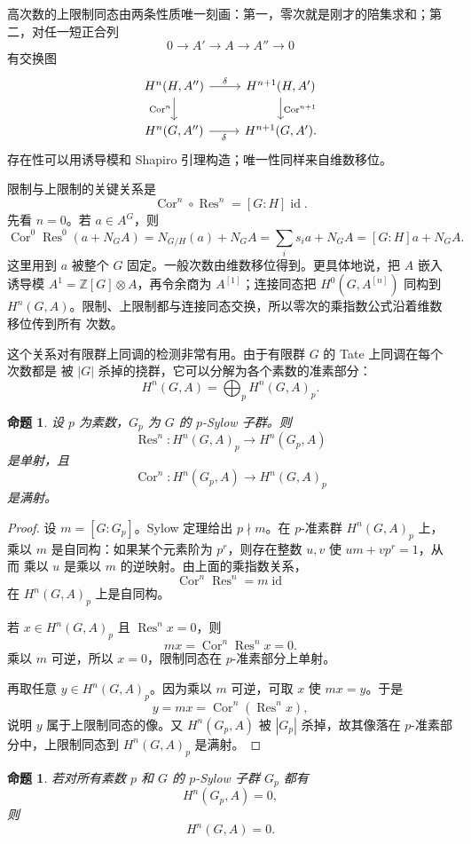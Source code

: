 \documentclass[11pt,a4paper,openany]{ctexbook}
\numberwithin{equation}{chapter}
\newcommand{\Z}{\mathbb{Z}}
\theoremstyle{plain}
\newtheorem{proposition}[theorem]{命题}
\theoremstyle{definition}
\theoremstyle{remark}
\begin{document}
高次数的上限制同态由两条性质唯一刻画：第一，零次就是刚才的陪集求和；第二，对任一短正合列
\[
0\to A'\to A\to A''\to0
\]
有交换图
\[
\begin{tikzcd}
H^n(H,A'')\arrow[r,"\delta"]\arrow[d,"\operatorname{Cor}^n"']&
H^{n+1}(H,A')\arrow[d,"\operatorname{Cor}^{n+1}"]\\
H^n(G,A'')\arrow[r,"\delta"']&
H^{n+1}(G,A').
\end{tikzcd}
\]
存在性可以用诱导模和 Shapiro 引理构造；唯一性同样来自维数移位。

限制与上限制的关键关系是
\[
\operatorname{Cor}^n\circ\operatorname{Res}^n=[G:H]\operatorname{id}.
\]
先看 $n=0$。若 $a\in A^G$，则
\[
\operatorname{Cor}^0\operatorname{Res}^0(a+N_GA)
=N_{G/H}(a)+N_GA
=\sum_i s_ia+N_GA
=[G:H]a+N_GA.
\]
这里用到 $a$ 被整个 $G$ 固定。一般次数由维数移位得到。更具体地说，把 $A$ 嵌入诱导模
$A^1=\Z[G]\otimes A$，再令余商为 $A^{[1]}$；连接同态把 $H^0(G,A^{[n]})$ 同构到
$H^n(G,A)$。限制、上限制都与连接同态交换，所以零次的乘指数公式沿着维数移位传到所有
次数。

这个关系对有限群上同调的检测非常有用。由于有限群 $G$ 的 Tate 上同调在每个次数都是
被 $|G|$ 杀掉的挠群，它可以分解为各个素数的准素部分：
\[
H^n(G,A)=\bigoplus_p H^n(G,A)_p.
\]

\begin{proposition}
设 $p$ 为素数，$G_p$ 为 $G$ 的 $p$-Sylow 子群。则
\[
\operatorname{Res}^n:H^n(G,A)_p\to H^n(G_p,A)
\]
是单射，且
\[
\operatorname{Cor}^n:H^n(G_p,A)\to H^n(G,A)_p
\]
是满射。
\end{proposition}

\begin{proof}
设 $m=[G:G_p]$。Sylow 定理给出 $p\nmid m$。在 $p$-准素群 $H^n(G,A)_p$ 上，乘以
$m$ 是自同构：如果某个元素阶为 $p^r$，则存在整数 $u,v$ 使 $um+vp^r=1$，从而
乘以 $u$ 是乘以 $m$ 的逆映射。由上面的乘指数关系，
\[
\operatorname{Cor}^n\operatorname{Res}^n=m\operatorname{id}
\]
在 $H^n(G,A)_p$ 上是自同构。

若 $x\in H^n(G,A)_p$ 且 $\operatorname{Res}^n x=0$，则
\[
mx=\operatorname{Cor}^n\operatorname{Res}^n x=0.
\]
乘以 $m$ 可逆，所以 $x=0$，限制同态在 $p$-准素部分上单射。

再取任意 $y\in H^n(G,A)_p$。因为乘以 $m$ 可逆，可取 $x$ 使 $mx=y$。于是
\[
y=mx=\operatorname{Cor}^n(\operatorname{Res}^n x),
\]
说明 $y$ 属于上限制同态的像。又 $H^n(G_p,A)$ 被 $|G_p|$ 杀掉，故其像落在
$p$-准素部分中，上限制同态到 $H^n(G,A)_p$ 是满射。
\end{proof}

\begin{proposition}
若对所有素数 $p$ 和 $G$ 的 $p$-Sylow 子群 $G_p$ 都有
\[
H^n(G_p,A)=0,
\]
则
\[
H^n(G,A)=0.
\]
\end{proposition}
\end{document}
